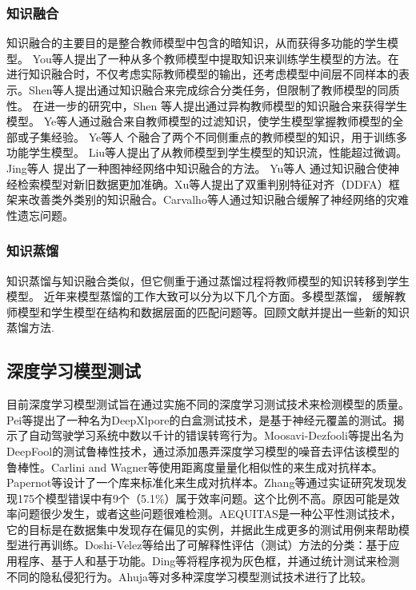 \documentclass[fontset=macnew,UTF8]{article} %
\begin{document}
\subsubsection{知识融合}
知识融合的主要目的是整合教师模型中包含的暗知识，从而获得多功能的学生模型。 You等人\cite{you2017learning}提出了一种从多个教师模型中提取知识来训练学生模型的方法。在进行知识融合时，不仅考虑实际教师模型的输出，还考虑模型中间层不同样本的表示。Shen等人\cite{shen2019amalgamating}提出通过知识融合来完成综合分类任务，但限制了教师模型的同质性。 在进一步的研究中，Shen 等人\cite{shen2019customizing}提出通过异构教师模型的知识融合来获得学生模型。 Ye等人\cite{ye2019amalgamating}通过融合来自教师模型的过滤知识，使学生模型掌握教师模型的全部或子集经验。 Ye等人\cite{ye2019student} 个融合了两个不同侧重点的教师模型的知识，用于训练多功能学生模型。 Liu等人\cite{liu2019knowledge}提出了从教师模型到学生模型的知识流，性能超过微调。 Jing等人\cite{jing2021amalgamating} 提出了一种图神经网络中知识融合的方法。 Yu等人\cite{yu2022arm} 通过知识融合使神经检索模型对新旧数据更加准确。Xu等人\cite{xu2022hierarchical}提出了双重判别特征对齐（DDFA）框架来改善类外类别的知识融合。Carvalho等人\cite{de2022class}通过知识融合缓解了神经网络的灾难性遗忘问题。
\subsubsection{知识蒸馏}
知识蒸馏与知识融合类似，但它侧重于通过蒸馏过程将教师模型的知识转移到学生模型。 近年来模型蒸馏的工作大致可以分为以下几个方面。多模型蒸馏\cite{zhao2020highlight,park2020feature}， 缓解教师模型和学生模型在结构和数据层面的匹配问题\cite{zhu2021student,mirzadeh2020improved,fang2021mosaicking}等。回顾文献\cite{wang2021knowledge,gou2021knowledge}并提出一些新的知识蒸馏方法\cite{li2022distilling,chen2022knowledge}.

\subsection{深度学习模型测试}
目前深度学习模型测试旨在通过实施不同的深度学习测试技术来检测模型的质量。Pei等\cite{pei2017deepxplore}提出了一种名为DeepXlpore的白盒测试技术，是基于神经元覆盖的测试。揭示了自动驾驶学习系统中数以千计的错误转弯行为。Moosavi-Dezfooli等\cite{moosavi2016deepfool}提出名为DeepFool的测试鲁棒性技术，通过添加愚弄深度学习模型的噪音去评估该模型的鲁棒性。Carlini and Wagner等\cite{carlini2017towards}使用距离度量量化相似性的来生成对抗样本。Papernot等\cite{goodfellow2016cleverhans,papernot2016technical}设计了一个库来标准化来生成对抗样本。Zhang等\cite{zhang2018empirical}通过实证研究发现发现175个模型错误中有9个（5.1\%）属于效率问题。这个比例不高。原因可能是效率问题很少发生，或者这些问题很难检测。AEQUITAS\cite{saleiro2018aequitas}是一种公平性测试技术，它的目标是在数据集中发现存在偏见的实例，并据此生成更多的测试用例来帮助模型进行再训练。Doshi-Velez等\cite{doshi2017towards}给出了可解释性评估（测试）方法的分类：基于应用程序、基于人和基于功能。Ding等\cite{ding2018detecting}将程序视为灰色框，并通过统计测试来检测不同的隐私侵犯行为。Ahuja等\cite{ahuja2022testing}对多种深度学习模型测试技术进行了比较。
\end{document}
